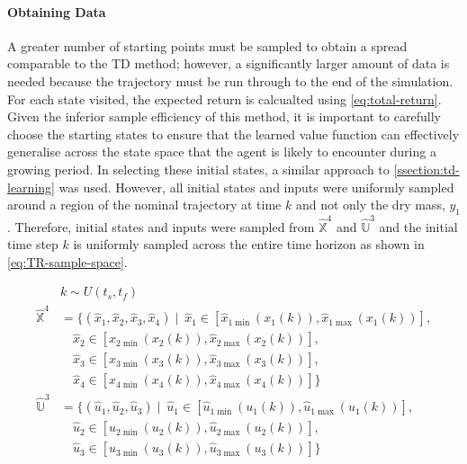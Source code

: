 \paragraph{Obtaining Data}
A greater number of starting points must be sampled to obtain a spread comparable to the TD method; however, a significantly larger amount of data is needed because the trajectory must be run through to the end of the simulation. For each state visited, the expected return is calcualted using \autoref{eq:total-return}. Given the inferior sample efficiency of this method, it is important to carefully choose the starting states to ensure that the learned value function can effectively generalise across the state space that the agent is likely to encounter during a growing period. In selecting these initial states, a similar approach to \autoref{ssection:td-learning} was used. However, all initial states and inputs were uniformly sampled around a region of the nominal trajectory at time $k$ and not only the dry mass, $y_1$. Therefore, initial states and inputs were sampled from $\hat{\mathbb{X}}^4$ and $\hat{\mathbb{U}}^3$ and the initial time step $k$ is uniformly sampled across the entire time horizon as shown in \autoref{eq:TR-sample-space}.

\begin{equation}\label{eq:TR-sample-space}
\begin{split}
	& k \sim U(t_s,t_f)  \\
    \hat{\mathbb{X}}^4 &= \{ (\hat{x}_1, \hat{x}_2, \hat{x}_3, \hat{x}_4) \mid\ \hat{x}_1 \in [\hat{x}_{1\min}(x_{1}(k)), \hat{x}_{1\max}(x_{1}(k))], \\
    &\quad \hat{x}_2 \in [\hat{x}_{2\min}(x_{2}(k)), \hat{x}_{2\max}(x_{2}(k))], \\
    &\quad \hat{x}_3 \in [\hat{x}_{3\min}(x_{3}(k)), \hat{x}_{3\max}(x_{3}(k))], \\
    &\quad \hat{x}_4 \in [\hat{x}_{4\min}(x_{4}(k)), \hat{x}_{4\max}(x_{4}(k))] \} \\
    \hat{\mathbb{U}}^3 &= \{ (\hat{u}_1, \hat{u}_2, \hat{u}_3) \mid\ \hat{u}_1 \in [\hat{u}_{1\min}(u_{1}(k)), \hat{u}_{1\max}(u_{1}(k))], \\
    &\quad \hat{u}_2 \in [\hat{u}_{2\min}(u_{2}(k)), \hat{u}_{2\max}(u_{2}(k))], \\
    &\quad \hat{u}_3 \in [\hat{u}_{3\min}(u_{3}(k)), \hat{u}_{3\max}(u_{3}(k))] \} \\    
\end{split}
\end{equation}

